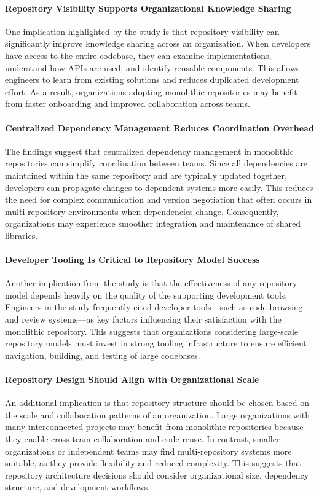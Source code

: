\paragraph{Repository Visibility Supports Organizational Knowledge Sharing}
One implication highlighted by the study is that repository visibility can significantly improve knowledge sharing across an organization. When developers have access to the entire codebase, they can examine implementations, understand how APIs are used, and identify reusable components. This allows engineers to learn from existing solutions and reduces duplicated development effort. As a result, organizations adopting monolithic repositories may benefit from faster onboarding and improved collaboration across teams.

\paragraph{Centralized Dependency Management Reduces Coordination Overhead}
The findings suggest that centralized dependency management in monolithic repositories can simplify coordination between teams. Since all dependencies are maintained within the same repository and are typically updated together, developers can propagate changes to dependent systems more easily. This reduces the need for complex communication and version negotiation that often occurs in multi-repository environments when dependencies change. Consequently, organizations may experience smoother integration and maintenance of shared libraries.

\paragraph{Developer Tooling Is Critical to Repository Model Success}
Another implication from the study is that the effectiveness of any repository model depends heavily on the quality of the supporting development tools. Engineers in the study frequently cited developer tools—such as code browsing and review systems—as key factors influencing their satisfaction with the monolithic repository. This suggests that organizations considering large-scale repository models must invest in strong tooling infrastructure to ensure efficient navigation, building, and testing of large codebases.

\paragraph{Repository Design Should Align with Organizational Scale}
An additional implication is that repository structure should be chosen based on the scale and collaboration patterns of an organization. Large organizations with many interconnected projects may benefit from monolithic repositories because they enable cross-team collaboration and code reuse. In contrast, smaller organizations or independent teams may find multi-repository systems more suitable, as they provide flexibility and reduced complexity. This suggests that repository architecture decisions should consider organizational size, dependency structure, and development workflows.

